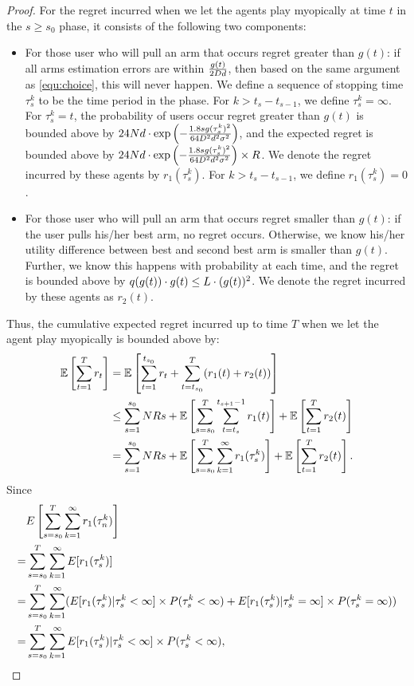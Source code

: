 \begin{proof}
For the regret incurred when we let the agents play myopically at time $t$ in the $s\geq s_0$ phase, it consists of the following two components:
\begin{itemize}
\item For those user who will pull an arm that occurs regret greater than $g(t)$: if all arms estimation errors are within $\frac{g(t)}{2D d}$, then based on the same argument as \eqref{equ:choice}, this will never happen. We define a sequence of stopping time $\tau_{s}^{k}$ to be the 
time period in the  phase.
For $k > t_{s}-t_{s-1}$, we define $\tau_{s}^{k}=\infty$.
For $\tau_{s}^{k}=t$, the probability of users occur regret greater than $g(t)$ is bounded above by
$24 N d \cdot \exp\left(-\frac{1.8 s g(\tau_{s}^{k})^2}{64 D^2 d^2\sigma^2}\right)$,
and the expected regret is bounded above by
$24 N d \cdot \exp\left(-\frac{1.8 s g(\tau_{s}^{k})^2}{64 D^2 d^2\sigma^2}\right)\times R$.
We denote the regret incurred by these agents by $r_1(\tau_{s}^{k})$.
For $k > t_{s}-t_{s-1}$, we define $r_1(\tau_{s}^{k})=0$.

\item For those user who will pull an arm that occurs regret smaller than $g(t)$: if the user pulls his/her best arm, no regret occurs. Otherwise, we know his/her utility difference between best and second best arm is smaller than $g(t)$. Further, we know this happens with probability  at each time,
and the regret is bounded above by
$q(g(t)) \cdot g(t) \leq L \cdot (g(t))^2$.
We denote the regret incurred by these agents as $r_2(t)$.
\end{itemize}

Thus, the cumulative expected regret incurred up to time $T$ when we
let the agent play myopically is bounded above by:
\begin{align}
\Expect{\sum_{t=1}^{T}\Regret{t}} 
& = \Expect{\sum_{t=1}^{t_{\LatePhase}} \Regret{t} + \sum_{t=t_{\LatePhase}}^{T}(r_1(t)+r_2(t))}  \nonumber \\
& \leq \sum_{s=1}^{\LatePhase} \ARMNUM \MAXR s
     + \Expect{\sum_{s=\LatePhase}^{T}\sum_{t=t_{s}}^{t_{s+1}-1}r_1(t)}
     + \Expect{\sum_{t=1}^{T}r_2(t)} \nonumber \\
& = \sum_{s=1}^{\LatePhase} \ARMNUM \MAXR s
     + \Expect{\sum_{s=\LatePhase}^{T} \sum_{k=1}^{\infty}r_1(\tau_{s}^{k})}
     + \Expect{\sum_{t=1}^{T}r_2(t)}. \label{chap5:equ:r1}
\end{align}
Since
\begin{align}
& E\left[\sum_{s=s_0}^{T}\sum_{k=1}^{\infty}r_1(\tau_{n}^{k})\right] \nonumber\\
= &  \sum_{s=s_0}^{T}\sum_{k=1}^{\infty}E[r_1(\tau_{s}^{k})] \nonumber \\
= &  \sum_{s=s_0}^{T}\sum_{k=1}^{\infty}(E[r_1(\tau_{s}^{k})|\tau_{s}^{k}<\infty]\times P(\tau_{s}^{k}<\infty)+E[r_1(\tau_{s}^{k})|\tau_{s}^{k}=\infty]\times P(\tau_{s}^{k}=\infty)) \nonumber \\
= & \sum_{s=s_0}^{T}\sum_{k=1}^{\infty}E[r_1(\tau_{s}^{k})|\tau_{s}^{k}<\infty]\times P(\tau_{s}^{k}<\infty), \nonumber
\end{align}


\end{proof}

